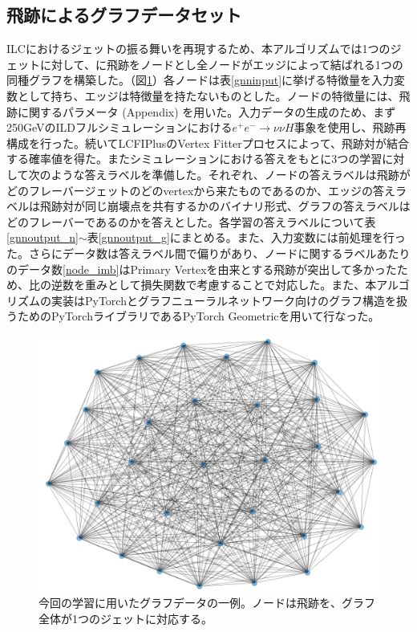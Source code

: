 \subsection{飛跡によるグラフデータセット}
ILCにおけるジェットの振る舞いを再現するため、本アルゴリズムでは1つのジェットに対して、に飛跡をノードとし全ノードがエッジによって結ばれる1つの同種グラフを構築した。（図\ref{1graph}）各ノードは表\ref{gnninput}に挙げる特徴量を入力変数として持ち、エッジは特徴量を持たないものとした。ノードの特徴量には、飛跡に関するパラメータ (Appendix) を用いた。入力データの生成のため、まず250GeVのILDフルシミュレーションにおける$e^+e^- \rightarrow \nu \nu H$事象を使用し、飛跡再構成を行った。続いてLCFIPlusのVertex Fitterプロセスによって、飛跡対が結合する確率値を得た。またシミュレーションにおける答えをもとに3つの学習に対して次のような答えラベルを準備した。それぞれ、ノードの答えラベルは飛跡がどのフレーバージェットのどのvertexから来たものであるのか、エッジの答えラベルは飛跡対が同じ崩壊点を共有するかのバイナリ形式、グラフの答えラベルはどのフレーバーであるのかを答えとした。各学習の答えラベルについて表\ref{gnnoutput_n}$\sim$表\ref{gnnoutput_g}にまとめる。また、入力変数には前処理を行った。さらにデータ数は答えラベル間で偏りがあり、ノードに関するラベルあたりのデータ数\ref{node_imb}はPrimary Vertexを由来とする飛跡が突出して多かったため、比の逆数を重みとして損失関数で考慮することで対応した。また、本アルゴリズムの実装はPyTorchとグラフニューラルネットワーク向けのグラフ構造を扱うためのPyTorchライブラリであるPyTorch Geometricを用いて行なった。
\begin{figure}[H]
	\begin{center}
 \includegraphics[keepaspectratio, scale=0.5]
 	{Figure/Flavortagging/graphexample.png}
 		\caption{今回の学習に用いたグラフデータの一例。ノードは飛跡を、グラフ全体が1つのジェットに対応する。}
 		\label{1graph}
	\end{center}
\end{figure}

